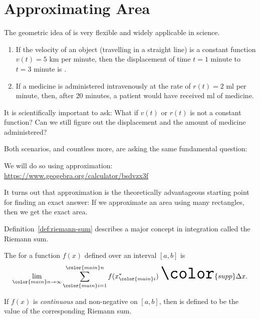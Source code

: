 \documentclass[../main.tex]{subfiles}
\begin{document}
 \section{Approximating Area}
The geometric idea of  is very flexible and widely applicable in science.

\begin{enumerate}[wide]
  \item If the velocity of an object (travelling in a straight line) is a constant function \(v(t) = 5\) km per minute, then the displacement of time \(t = 1\) minute to \(t = 3\) minute is \underline{\hspace{2in}}.


  \item If a medicine is administered intravenously at the rate of \(r(t) = 2\) ml per minute, then, after \(20\) minutes, a patient would have received \underline{\hspace{3in}} ml of medicine.

\end{enumerate}

It is scientifically important to ask: What if \(v(t)\) or \(r(t)\) is not a constant function?  Can we still figure out the displacement and the amount of medicine administered?


Both scenarios, and countless more, are asking the same fundamental  question: 


We will do so using approximation:
\url{https://www.geogebra.org/calculator/bsdvzx3f}
\clearpage

It turns out that approximation is the theoretically advantageous starting point for finding an exact answer: If we approximate an area using \underline{\hspace{2in}} many rectangles, then we get the exact area.

Definition~\ref{def:riemann-sum} describes a major concept in integration called the Riemann sum.

\begin{definition} \label{def:riemann-sum}
  The  for a function \(f(x)\) defined over an interval \([a,b]\) is
  \begin{equation} \label{eq:area-under-the-curve} \Huge
    \lim_{{\color{main}n} \to \infty} \sum_{{\color{main}i}=1}^{{\color{main}n}} f(x_{{\color{main}i}}^{*}) \; {\color{supp} \Delta x}.
  \end{equation}

  If \(f(x)\) is \emph{continuous} and non-negative on \([a,b]\), then  is defined to be the value of the corresponding Riemann sum.

\end{definition}
\end{document}

